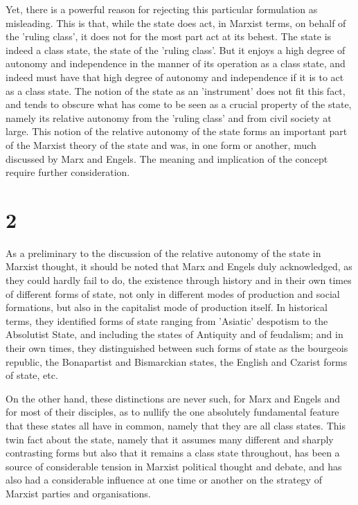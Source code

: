 Yet, there is a powerful reason for rejecting this particular formulation as misleading. This is that, while the state does act, in Marxist terms, on behalf of the 'ruling class', it does not for the most part act at its behest. The state is indeed a class state, the state of the 'ruling class'. But it enjoys a high degree of autonomy and independence in the manner of its operation as a class state, and indeed must have that high degree of autonomy and independence if it is to act as a class state. The notion of the state as an 'instrument' does not fit this fact, and tends to obscure what has come to be seen as a crucial property of the state, namely its relative autonomy from the 'ruling class' and from civil society at large. This notion of the relative autonomy of the state forms an important part of the Marxist theory of the state and was, in one form or another, much discussed by Marx and Engels. The meaning and implication of the concept require further consideration.

\section*{2}
As a preliminary to the discussion of the relative autonomy of the state in Marxist thought, it should be noted that Marx and Engels duly acknowledged, as they could hardly fail to do, the existence through history and in their own times of different forms of state, not only in different modes of production and social formations, but also in the capitalist mode of production itself. In historical terms, they identified forms of state ranging from 'Asiatic' despotism to the Absolutist State, and including the states of Antiquity and of feudalism; and in their own times, they distinguished between such forms of state as the bourgeois republic, the Bonapartist and Bismarckian states, the English and Czarist forms of state, etc.

On the other hand, these distinctions are never such, for Marx and Engels and for most of their disciples, as to nullify the one absolutely fundamental feature that these states all have in common, namely that they are all class states. This twin fact about the state, namely that it assumes many different and sharply contrasting forms but also that it remains a class state throughout, has been a source of considerable tension in Marxist political thought and debate, and has also had a considerable  influence at one time or another on the strategy of Marxist parties and organisations.

